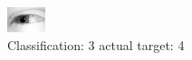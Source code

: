 \begin{figure}[h!]
\begin{center}
\includegraphics[width=0.60\columnwidth]{figures/ID2442_class_3_target_4.png}
\end{center}
\caption{ Classification: 3 actual target: 4}
\label{fig:ID2442_class_3_target_4}
\end{figure}
